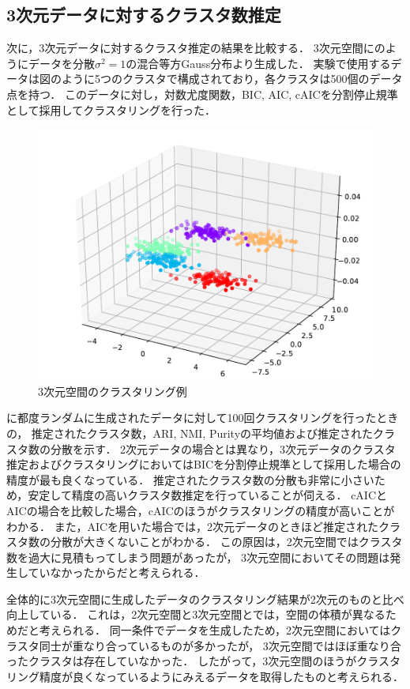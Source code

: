 \subsection{3次元データに対するクラスタ数推定}

次に，3次元データに対するクラスタ推定の結果を比較する．
3次元空間にのようにデータを分散$\sigma^2=1$の混合等方Gauss分布より生成した．
実験で使用するデータは図のように5つのクラスタで構成されており，各クラスタは500個のデータ点を持つ．
このデータに対し，対数尤度関数，BIC, AIC, cAICを分割停止規準として採用してクラスタリングを行った．

\begin{figure}[htbp]
  \begin{center}
    \includegraphics[width=0.7\linewidth]{./img/BIC_3.pdf}
      \caption{3次元空間のクラスタリング例}
      \label{fig:3dim}
  \end{center}
\end{figure}

に都度ランダムに生成されたデータに対して100回クラスタリングを行ったときの，
推定されたクラスタ数，ARI, NMI, Purityの平均値および推定されたクラスタ数の分散を示す．
2次元データの場合とは異なり，3次元データのクラスタ推定およびクラスタリングにおいてはBICを分割停止規準として採用した場合の精度が最も良くなっている．
推定されたクラスタ数の分散も非常に小さいため，安定して精度の高いクラスタ数推定を行っていることが伺える．
cAICとAICの場合を比較した場合，cAICのほうがクラスタリングの精度が高いことがわかる．
また，AICを用いた場合では，2次元データのときほど推定されたクラスタ数の分散が大きくないことがわかる．
この原因は，2次元空間ではクラスタ数を過大に見積もってしまう問題があったが，
3次元空間においてその問題は発生していなかったからだと考えられる．

全体的に3次元空間に生成したデータのクラスタリング結果が2次元のものと比べ向上している．
これは，2次元空間と3次元空間とでは，空間の体積が異なるためだと考えられる．
同一条件でデータを生成したため，2次元空間においてはクラスタ同士が重なり合っているものが多かったが，
3次元空間ではほぼ重なり合ったクラスタは存在していなかった．
したがって，3次元空間のほうがクラスタリング精度が良くなっているようにみえるデータを取得したものと考えられる．

